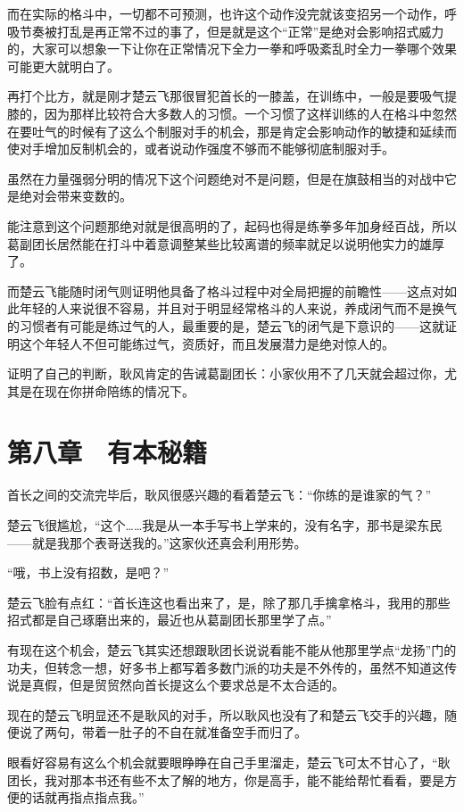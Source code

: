 而在实际的格斗中，一切都不可预测，也许这个动作没完就该变招另一个动作，呼吸节奏被打乱是再正常不过的事了，但是就是这个“正常”是绝对会影响招式威力的，大家可以想象一下让你在正常情况下全力一拳和呼吸紊乱时全力一拳哪个效果可能更大就明白了。

再打个比方，就是刚才楚云飞那很冒犯首长的一膝盖，在训练中，一般是要吸气提膝的，因为那样比较符合大多数人的习惯。一个习惯了这样训练的人在格斗中忽然在要吐气的时候有了这么个制服对手的机会，那是肯定会影响动作的敏捷和延续而使对手增加反制机会的，或者说动作强度不够而不能够彻底制服对手。

虽然在力量强弱分明的情况下这个问题绝对不是问题，但是在旗鼓相当的对战中它是绝对会带来变数的。

能注意到这个问题那绝对就是很高明的了，起码也得是练拳多年加身经百战，所以葛副团长居然能在打斗中着意调整某些比较离谱的频率就足以说明他实力的雄厚了。

而楚云飞能随时闭气则证明他具备了格斗过程中对全局把握的前瞻性——这点对如此年轻的人来说很不容易，并且对于明显经常格斗的人来说，养成闭气而不是换气的习惯者有可能是练过气的人，最重要的是，楚云飞的闭气是下意识的——这就证明这个年轻人不但可能练过气，资质好，而且发展潜力是绝对惊人的。

证明了自己的判断，耿风肯定的告诫葛副团长：小家伙用不了几天就会超过你，尤其是在现在你拼命陪练的情况下。

\section{第八章　有本秘籍}

首长之间的交流完毕后，耿风很感兴趣的看着楚云飞：“你练的是谁家的气？”

楚云飞很尴尬，“这个……我是从一本手写书上学来的，没有名字，那书是梁东民——就是我那个表哥送我的。”这家伙还真会利用形势。

“哦，书上没有招数，是吧？”

楚云飞脸有点红：“首长连这也看出来了，是，除了那几手擒拿格斗，我用的那些招式都是自己琢磨出来的，最近也从葛副团长那里学了点。”

有现在这个机会，楚云飞其实还想跟耿团长说说看能不能从他那里学点“龙扬”门的功夫，但转念一想，好多书上都写着多数门派的功夫是不外传的，虽然不知道这传说是真假，但是贸贸然向首长提这么个要求总是不太合适的。

现在的楚云飞明显还不是耿风的对手，所以耿风也没有了和楚云飞交手的兴趣，随便说了两句，带着一肚子的不自在就准备空手而归了。

眼看好容易有这么个机会就要眼睁睁在自己手里溜走，楚云飞可太不甘心了，“耿团长，我对那本书还有些不太了解的地方，你是高手，能不能给帮忙看看，要是方便的话就再指点指点我。”

